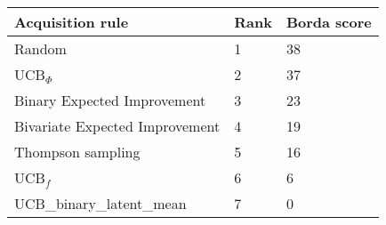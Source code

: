 \begin{tabular}{lll}
Acquisition rule & Rank & Borda score \\ 
\hline 
Random                                        & 1 & 38 \\ 
UCB$_\Phi$                                    & 2 & 37 \\ 
Binary Expected Improvement \citep{Tesch2013} & 3 & 23 \\ 
Bivariate Expected Improvement                & 4 & 19 \\ 
Thompson sampling                             & 5 & 16 \\ 
UCB$_f$ \citep{Tesch2013}                     & 6 & 6 \\ 
UCB_binary_latent_mean                        & 7 & 0 \\ 
\hline 
\end{tabular}
